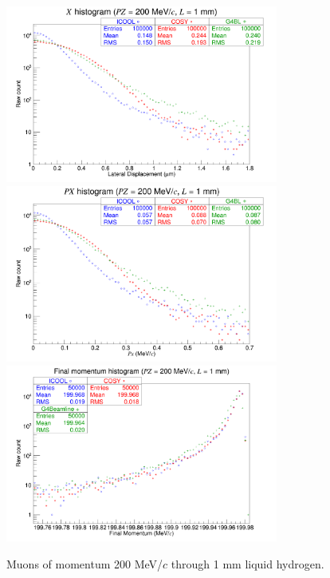 \begin{figure}[!htb]
  \centering
    \includegraphics[width=0.8\textwidth]{Validation/LH/X.200.1.png} 
    \includegraphics[width=0.8\textwidth]{Validation/LH/PX.200.1.png} 
    \includegraphics[width=0.8\textwidth]{Validation/LH/strag.200.1.png} 
  \caption{Muons of momentum 200 MeV/$c$ through 1 mm liquid hydrogen.}
  \label{fig:200.1}
\end{figure}

